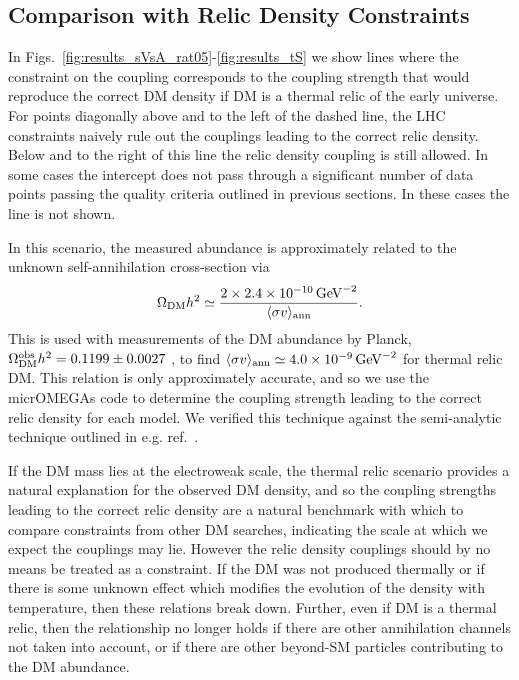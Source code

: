 \subsection{Comparison with Relic Density Constraints}


In Figs.~\ref{fig:results_sVsA_rat05}-\ref{fig:results_tS} we show lines where the constraint on the coupling corresponds to the coupling strength that would reproduce the correct DM density if DM is a thermal relic of the early universe. For points diagonally above and to the left of the dashed line, the LHC constraints naively rule out the couplings leading to the correct relic density. Below and to the right of this line the relic density coupling is still allowed. In some cases the intercept does not pass through a significant number of  data points passing the quality criteria outlined in previous sections. In these cases the line is not shown.

 In this scenario, the measured abundance is approximately related to the unknown self-annihilation cross-section via
%
\begin{equation}
  \Omega_{\rm DM}h^2\simeq \frac{2\times2.4\times 10^{-10}\,{\rm GeV}^{-2}}{\langle\sigma v\rangle_{\rm ann}}.
  \label{simplerelic}
\end{equation}
%
This is used with measurements of the DM abundance by Planck, $\Omega_{\rm DM}^{\rm obs}h^2=0.1199\pm0.0027$ \cite{Ade:2013zuv}, to find $\langle\sigma v\rangle_{\rm ann}\simeq 4.0\times 10^{-9}\,{\rm GeV}^{-2}$ for thermal relic DM.
%
This relation is only approximately accurate, and so we use the micrOMEGAs code \cite{Belanger:2014vza} to determine the coupling strength leading to the correct relic density for each model. We verified this technique against the semi-analytic technique outlined in e.g. ref.~\cite{Busoni:2014gta}.

If the DM mass lies at the electroweak scale, the thermal relic scenario provides a natural explanation for the observed DM density, and so the coupling strengths leading to the correct relic density are a natural  benchmark with which to compare constraints from other DM searches, indicating the scale at which we expect the couplings may lie. However the relic density couplings should by no means be treated as a constraint. If the DM was not produced thermally or if there is some unknown effect which modifies the evolution of the density with temperature, then these relations break down. Further, even if DM is a thermal relic, then the relationship no longer holds if there are other annihilation channels not taken into account, or if there are other beyond-SM particles contributing to the DM abundance.

